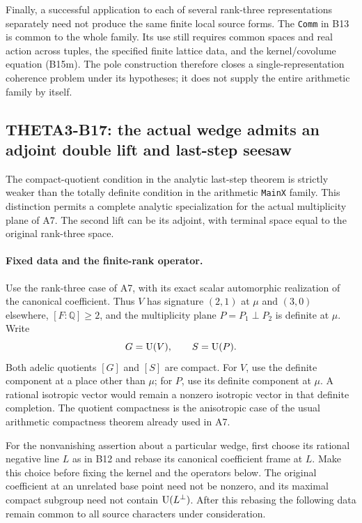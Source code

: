 \documentclass[11pt]{article}
\newcommand{\Q}{\mathbb Q}\newcommand{\C}{\mathbb C}\newcommand{\Z}{\mathbb Z}\newcommand{\R}{\mathbb R}\newcommand{\A}{\mathbb A}\newcommand{\OO}{\mathcal O}
\theoremstyle{definition}\newtheorem{definition}[theorem]{Definition}\newtheorem{remark}[theorem]{Remark}
\begin{document}
Finally, a successful application to each of several rank-three representations separately need not produce the same finite local source forms. The \texttt{Comm} in B13 is common to the whole family. Its use still requires common spaces and real action across tuples, the specified finite lattice data, and the kernel/covolume equation (B15m). The pole construction therefore closes a single-representation coherence problem under its hypotheses; it does not supply the entire arithmetic family by itself.


\subsection{THETA3-B17: the actual wedge admits an adjoint double lift and last-step seesaw}\label{B17}

The compact-quotient condition in the analytic last-step theorem is
strictly weaker than the totally definite condition in the arithmetic
\texttt{MainX} family. This distinction permits a complete analytic
specialization for the actual multiplicity plane of A7. The second
lift can be its adjoint, with terminal space equal to the original
rank-three space.

\paragraph{Fixed data and the finite-rank operator.}
Use the rank-three case of A7, with its exact scalar automorphic
realization of the canonical coefficient. Thus $V$ has signature
$(2,1)$ at $\mu$ and $(3,0)$ elsewhere, $[F:\Q]\geq2$, and the
multiplicity plane $P=P_1\perp P_2$ is definite at $\mu$.
Write
\[
 G=\operatorname{U}(V),\qquad S=\operatorname{U}(P).
\]
Both adelic quotients $[G]$ and $[S]$ are compact. For $V$, use
the definite component at a place other than $\mu$; for $P$, use
its definite component at $\mu$. A rational isotropic vector would
remain a nonzero isotropic vector in that definite completion.
The quotient compactness is the anisotropic case of the usual
arithmetic compactness theorem already used in A7.

For the nonvanishing assertion about a particular wedge, first
choose its rational negative line $L$ as in B12 and rebase its
canonical coefficient frame at $L$. Make this choice before
fixing the kernel and the operators below. The original
coefficient at an unrelated base point need not be nonzero,
and its maximal compact subgroup need not contain $\operatorname{U}(L^\perp)$.
After this rebasing the following data remain common to all
source characters under consideration.
\end{document}
